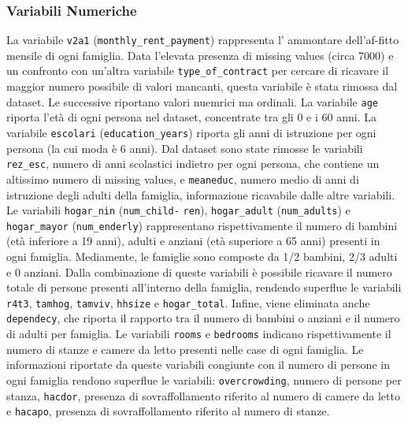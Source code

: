 

\subsubsection{Variabili Numeriche}

La variabile \texttt{v2a1} (\texttt{monthly\_rent\_payment}) rappresenta l' ammontare dell'af-fitto mensile di ogni famiglia.
Data l'elevata presenza di missing values (circa 7000) e  un confronto con un'altra variabile \texttt{type\_of\_contract} per cercare di ricavare il maggior numero possibile di valori mancanti, questa variabile è stata rimossa dal dataset. Le successive riportano valori nuemrici ma ordinali.
La variabile \texttt{age} riporta l'età di ogni persona nel dataset, concentrate  tra gli 0 e i 60 anni.
La variabile \texttt{escolari} (\texttt{education\_years}) riporta gli anni di istruzione per ogni persona (la cui moda è 6 anni). 
Dal dataset sono state rimosse le variabili \texttt{rez\_esc}, numero di anni scolastici indietro per ogni persona, che contiene un altissimo numero di missing values, e \texttt{meaneduc}, numero medio di anni di istruzione degli adulti della famiglia, informazione ricavabile dalle altre variabili.
Le variabili \texttt{hogar\_nin} (\texttt{num\_child-} \texttt{ren}), \texttt{hogar\_adult} (\texttt{num\_adults}) e  \texttt{hogar\_mayor} (\texttt{num\_enderly}) rappresentano rispettivamente il numero di bambini (età inferiore a 19 anni), adulti e anziani (età superiore a 65 anni) presenti in ogni famiglia. Mediamente, le famiglie sono composte da 1/2 bambini, 2/3 adulti e 0 anziani.
Dalla combinazione di queste variabili è possibile ricavare il numero totale di persone presenti all'interno della famiglia, rendendo superflue le variabili \texttt{r4t3}, \texttt{tamhog}, \texttt{tamviv}, \texttt{hhsize} e \texttt{hogar\_total}. Infine, viene eliminata anche \texttt{dependecy}, che riporta il rapporto tra il numero di bambini o anziani e il numero di adulti per famiglia. 
Le variabili \texttt{rooms} e \texttt{bedrooms} indicano rispettivamente il numero di stanze e camere da letto presenti nelle case di ogni famiglia.
Le informazioni riportate da queste variabili congiunte con il numero di persone in ogni famiglia rendono superflue le variabili: \texttt{overcrowding}, numero di persone per stanza, \texttt{hacdor}, presenza di sovraffollamento riferito al numero di camere da letto e \texttt{hacapo}, presenza di sovraffollamento riferito al numero di stanze.
